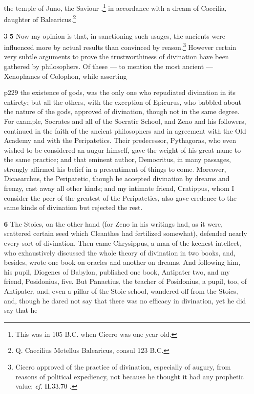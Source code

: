 the temple of Juno, the Saviour ,\texthebrew{}\footnote{This was in 105 B.C. when Cicero was one year old.

} in accordance with a dream of Caecilia, daughter of Balearicus.\footnote{Q. Caecilius Metellus Balearicus, consul 123 B.C.

}

3
\textbf{5} Now my opinion is that, in sanctioning such usages, the ancients were influenced more by actual results than convinced by reason.\texthebrew{}\footnote{Cicero approved of the practice of divination, especially of augury, from reasons of political expediency, not because he thought it had any prophetic value; \emph{cf.}
II.33.70 .

} However certain very subtle arguments to prove the trustworthiness of divination have been gathered by philosophers. Of these \texthebrew{—} to mention the most ancient \texthebrew{—} Xenophanes of Colophon, while asserting

p229 the existence of gods, was the only one who repudiated divination in its entirety; but all the others, with the exception of Epicurus, who babbled about the nature of the gods, approved of divination, though not in the same degree. For example, Socrates and all of the Socratic School, and Zeno and his followers, continued in the faith of the ancient philosophers and in agreement with the Old Academy and with the Peripatetics. Their predecessor, Pythagoras, who even wished to be considered an augur himself, gave the weight of his great name to the same practice; and that eminent author, Democritus, in many passages, strongly affirmed his belief in a presentiment of things to come. Moreover, Dicaearchus, the Peripatetic, though he accepted divination by dreams and frenzy, cast away all other kinds; and my intimate friend, Cratippus, whom I consider the peer of the greatest of the Peripatetics, also gave credence to the same kinds of divination but rejected the rest.

\textbf{6} The Stoics, on the other hand (for Zeno in his writings had, as it were, scattered certain seed which Cleanthes had fertilized somewhat), defended nearly every sort of divination. Then came Chrysippus, a man of the keenest intellect, who exhaustively discussed the whole theory of divination in two books, and, besides, wrote one book on oracles and another on dreams. And following him, his pupil, Diogenes of Babylon, published one book, Antipater two, and my friend, Posidonius, five. But Panaetius, the teacher of Posidonius, a pupil, too, of Antipater, and, even a pillar of the Stoic school, wandered off from the Stoics, and, though he dared not say that there was no efficacy in divination, yet he did say that he

